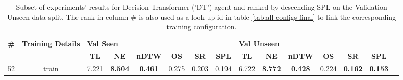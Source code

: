 \begin{table}
\centering
\caption{\label{tab:dt_rezero}Subset of experiments' results for Decision Transformer ('DT') agent and ranked by descending SPL on the Validation Unseen data split. The rank in column \# is also used as a look up id in table \ref{tab:all-configs-final} to link the corresponding training configuration.}
\begin{tabular}{@{\hskip3pt}c@{\hskip3pt}c@{\hskip3pt}c@{\hskip3pt}c@{\hskip3pt}c@{\hskip3pt}c@{\hskip3pt}c@{\hskip3pt}c@{\hskip3pt}c@{\hskip3pt}c@{\hskip3pt}c@{\hskip3pt}c@{\hskip3pt}c@{\hskip3pt}c@{\hskip3pt}c}
\toprule
\textbf{\#} & \textbf{Training Details} & \multicolumn{6}{l}{\textbf{Val Seen}} & \multicolumn{6}{l}{\textbf{Val Unseen}} \\
 \textbf{~} &                \textbf{~} &       \textbf{TL} &     \textbf{NE} &   \textbf{nDTW} & \textbf{OS} & \textbf{SR} & \textbf{SPL} &         \textbf{TL} &     \textbf{NE} &   \textbf{nDTW} & \textbf{OS} &     \textbf{SR} &    \textbf{SPL} \\
\midrule
         52 &                     train &             7.221 &  \textbf{8.504} &  \textbf{0.461} &       0.275 &       0.203 &        0.194 &               6.722 &  \textbf{8.772} &  \textbf{0.428} &       0.224 &  \textbf{0.162} &  \textbf{0.153} \\
\bottomrule
\end{tabular}
\end{table}
